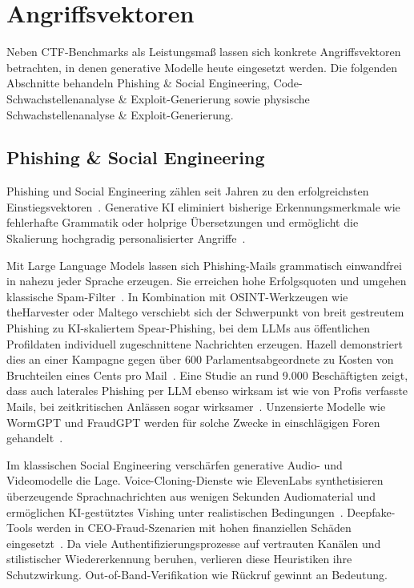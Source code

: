 \section{Angriffsvektoren}
\label{sec:angriffsvektoren}
Neben CTF-Benchmarks als Leistungsmaß lassen sich konkrete Angriffsvektoren betrachten, in denen generative Modelle heute eingesetzt werden. Die folgenden Abschnitte behandeln Phishing \& Social Engineering, Code-Schwachstellenanalyse \& Exploit-Generierung sowie physische Schwachstellenanalyse \& Exploit-Generierung.

\subsection{Phishing \& Social Engineering}
Phishing und Social Engineering zählen seit Jahren zu den erfolgreichsten Einstiegsvektoren~\cite{alabdan_phishing_2020,naqvi_mitigation_2023,quinkert_spotlight_2021}. Generative KI eliminiert bisherige Erkennungsmerkmale wie fehlerhafte Grammatik oder holprige Übersetzungen und ermöglicht die Skalierung hochgradig personalisierter Angriffe~\cite{hazell_spear_2023,Siva_social_2025}.

Mit Large Language Models lassen sich Phishing-Mails grammatisch einwandfrei in nahezu jeder Sprache erzeugen. Sie erreichen hohe Erfolgsquoten und umgehen klassische Spam-Filter~\cite{karanjai_targeted_2023}. In Kombination mit OSINT-Werkzeugen wie theHarvester oder Maltego verschiebt sich der Schwerpunkt von breit gestreutem Phishing zu KI-skaliertem Spear-Phishing, bei dem LLMs aus öffentlichen Profildaten individuell zugeschnittene Nachrichten erzeugen. Hazell demonstriert dies an einer Kampagne gegen über 600 Parlamentsabgeordnete zu Kosten von Bruchteilen eines Cents pro Mail~\cite{hazell_spear_2023}. Eine Studie an rund 9.000 Beschäftigten zeigt, dass auch laterales Phishing per LLM ebenso wirksam ist wie von Profis verfasste Mails, bei zeitkritischen Anlässen sogar wirksamer~\cite{bethany_lateral_2025}. Unzensierte Modelle wie WormGPT und FraudGPT werden für solche Zwecke in einschlägigen Foren gehandelt~\cite{mohamed_wormgpt_2023,falade_decoding_2023}.

Im klassischen Social Engineering verschärfen generative Audio- und Videomodelle die Lage. Voice-Cloning-Dienste wie ElevenLabs synthetisieren überzeugende Sprachnachrichten aus wenigen Sekunden Audiomaterial und ermöglichen KI-gestütztes Vishing unter realistischen Bedingungen~\cite{toapanta_aidriven_2024}. Deepfake-Tools werden in CEO-Fraud-Szenarien mit hohen finanziellen Schäden eingesetzt~\cite{Siva_social_2025}. Da viele Authentifizierungsprozesse auf vertrauten Kanälen und stilistischer Wiedererkennung beruhen, verlieren diese Heuristiken ihre Schutzwirkung. Out-of-Band-Verifikation wie Rückruf gewinnt an Bedeutung.

